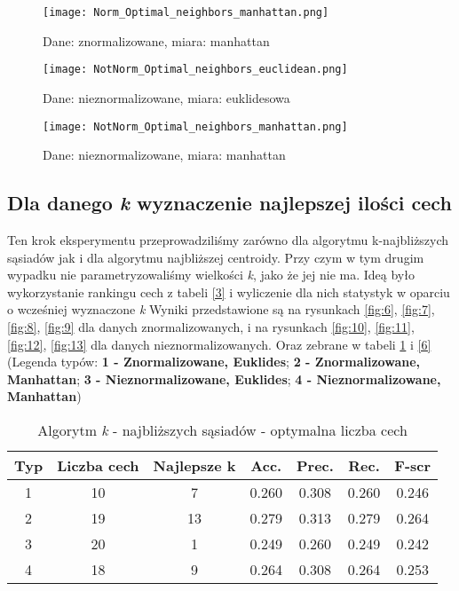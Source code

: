 		\begin{figure}[H]
			\centering
			\texttt{[image: Norm\_Optimal\_neighbors\_manhattan.png]}
			\captionsetup{justification=centering}
			\caption{Dane: znormalizowane, miara: manhattan}
			\label{fig:3}
		\end{figure}
		
		\begin{figure}[H]
			\centering
			\texttt{[image: NotNorm\_Optimal\_neighbors\_euclidean.png]}
			\captionsetup{justification=centering}
			\caption{Dane: nieznormalizowane, miara: euklidesowa}
			\label{fig:4}
		\end{figure}
		
		\begin{figure}[H]
			\centering
			\texttt{[image: NotNorm\_Optimal\_neighbors\_manhattan.png]}
			\captionsetup{justification=centering}
			\caption{Dane: nieznormalizowane, miara: manhattan}
			\label{fig:5}
		\end{figure}
	
	\subsection{Dla danego \textit{k} wyznaczenie najlepszej ilości cech}
		
		Ten krok eksperymentu przeprowadziliśmy zarówno dla algorytmu k-najbliższych sąsiadów jak i dla algorytmu najbliższej centroidy. Przy czym w tym drugim wypadku nie parametryzowaliśmy wielkości \textit{k}, jako że jej nie ma.
		\bigbreak
		Ideą było wykorzystanie rankingu cech z tabeli \ref{3} i wyliczenie dla nich statystyk w oparciu o wcześniej wyznaczone \textit{k}
		\bigbreak
		Wyniki przedstawione są na rysunkach \ref{fig:6}, \ref{fig:7}, \ref{fig:8}, \ref{fig:9} dla danych znormalizowanych, i na rysunkach \ref{fig:10}, \ref{fig:11}, \ref{fig:12}, \ref{fig:13} dla danych nieznormalizowanych. Oraz zebrane w tabeli \ref{5} i \ref{6}(Legenda typów: \textbf{1 - Znormalizowane, Euklides}; \textbf{2 - Znormalizowane, Manhattan}; \textbf{3 - Nieznormalizowane, Euklides}; \textbf{4 - Nieznormalizowane, Manhattan})
		
		\begin{table}[h!]
			\centering
			\begin{tabular}{|| c | c | c  | c | c | c | c ||} 
				\hline
				Typ & Liczba cech & Najlepsze k & Acc. &  Prec. & Rec. & F-scr \\ [0.5ex] 
				\hline\hline
				1 & 10 & 7 & 0.260 & 0.308 & 0.260 & 0.246 \\ 
				2 & 19 & 13 &  0.279 & 0.313 & 0.279 & 0.264 \\
				3 & 20 & 1 &  0.249 & 0.260 & 0.249 & 0.242 \\
				4 & 18 & 9 &  0.264 & 0.308 & 0.264 & 0.253\\[1ex] 
				\hline
			\end{tabular}
			\caption{Algorytm \textit{k} - najbliższych sąsiadów - optymalna liczba cech}
			\label{5}
		\end{table}
	
